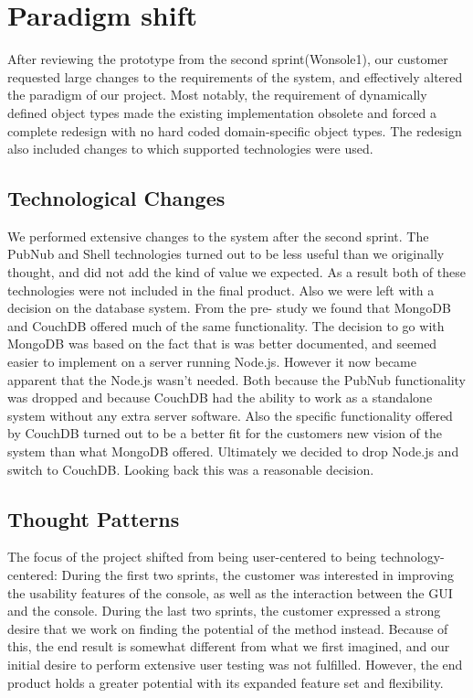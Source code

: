 \section{Paradigm shift}
After reviewing the prototype from the second sprint(Wonsole1), our customer requested large changes to the requirements of the system, and effectively altered the paradigm of our project. Most notably, the requirement of dynamically defined object types made the existing implementation obsolete and forced a complete redesign with no hard coded domain-specific object types. The redesign also included changes to which supported technologies were used.

\subsection{Technological Changes}
We performed extensive changes to the system after the second sprint. The PubNub and Shell technologies turned out to be less useful than we originally thought, and did not add the kind of value we expected. As a result both of these technologies were not included in the final product. Also we were left with a decision on the database system. From the pre- study we found that MongoDB and CouchDB offered much of the same functionality. The decision to go with MongoDB was based on the fact that is was better documented, and seemed easier to implement on a server running Node.js. However it now became apparent that the Node.js wasn’t needed. Both because the PubNub functionality was dropped and because CouchDB had the ability to work as a standalone system without any extra server software. Also the specific functionality offered by CouchDB turned out to be a better fit for the customers new vision of the system than what MongoDB offered. Ultimately we decided to drop Node.js and switch to CouchDB. Looking back this was a reasonable decision.

\subsection{Thought Patterns}
The focus of the project shifted from being user-centered to being technology-centered: During the first two sprints, the customer was interested in improving the usability features of the console, as well as the interaction between the GUI and the console. During the last two sprints, the customer expressed a strong desire that we work on finding the potential of the method instead. Because of this, the end result is somewhat different from what we first imagined, and our initial desire to perform extensive user testing was not fulfilled. However, the end product holds a greater potential with its expanded feature set and flexibility.

